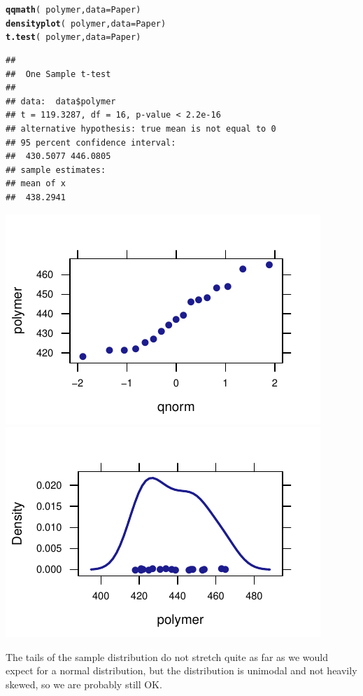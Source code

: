 \documentclass[twoside]{book}\usepackage[]{graphicx}\usepackage[]{xcolor}
\makeatletter
\def\maxwidth{ %
  \ifdim\Gin@nat@width>\linewidth
    \linewidth
  \else
    \Gin@nat@width
  \fi
}
\newcommand{\hlopt}[1]{\textcolor[rgb]{0,0,0}{#1}}%
\newcommand{\hlstd}[1]{\textcolor[rgb]{0.345,0.345,0.345}{#1}}%
\newcommand{\hlkwc}[1]{\textcolor[rgb]{0.333,0.667,0.333}{#1}}%
\newcommand{\hlkwd}[1]{\textcolor[rgb]{0.737,0.353,0.396}{\textbf{#1}}}%
\newenvironment{kframe}{%
 \def\at@end@of@kframe{}%
 \ifinner\ifhmode%
  \def\at@end@of@kframe{\end{minipage}}%
  \begin{minipage}{\columnwidth}%
 \fi\fi%
 \def\FrameCommand##1{\hskip\@totalleftmargin \hskip-\fboxsep
 \colorbox{shadecolor}{##1}\hskip-\fboxsep
     \hskip-\linewidth \hskip-\@totalleftmargin \hskip\columnwidth}%
 \MakeFramed {\advance\hsize-\width
   \@totalleftmargin\z@ \linewidth\hsize
   \@setminipage}}%
 {\par\unskip\endMakeFramed%
 \at@end@of@kframe}
\newenvironment{knitrout}{}{} %
\makeatother
\begin{document}
\begin{solution}
\begin{knitrout}
\color{fgcolor}\begin{kframe}
\begin{alltt}
\hlkwd{qqmath}\hlstd{(}\hlopt{~}\hlstd{polymer,} \hlkwc{data} \hlstd{= Paper)}
\hlkwd{densityplot}\hlstd{(}\hlopt{~}\hlstd{polymer,} \hlkwc{data} \hlstd{= Paper)}
\hlkwd{t.test}\hlstd{(}\hlopt{~}\hlstd{polymer,} \hlkwc{data} \hlstd{= Paper)}
\end{alltt}
\begin{verbatim}
## 
## 	One Sample t-test
## 
## data:  data$polymer
## t = 119.3287, df = 16, p-value < 2.2e-16
## alternative hypothesis: true mean is not equal to 0
## 95 percent confidence interval:
##  430.5077 446.0805
## sample estimates:
## mean of x 
##  438.2941
\end{verbatim}
\end{kframe}

{\centering \includegraphics[width=\maxwidth]{figures/fig-unnamed-chunk-157-1} 
\includegraphics[width=\maxwidth]{figures/fig-unnamed-chunk-157-2} 

}



\end{knitrout}
The tails of the sample distribution do not stretch quite as far as we would expect 
for a normal distribution, but the distribution is unimodal and not heavily skewed,
so we are probably still OK.
\end{solution}
\end{document}
